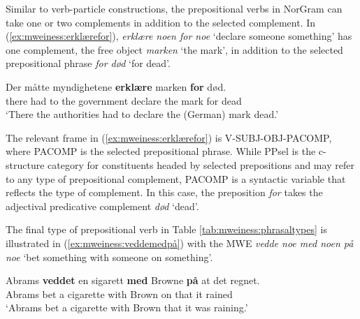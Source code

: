 \documentclass[output=paper]{langsci/langscibook}
\begin{document}
Similar to verb-particle constructions, the prepositional verbs in NorGram can take one or two complements in addition to the selected complement. 
In (\ref{ex:mweiness:erklærefor}), \emph{erklære noen for noe} `declare someone something' has one complement, the free object \emph{marken} `the mark',  in addition to the selected prepositional phrase  \emph{for død} `for dead'. 

\ea\label{ex:mweiness:erklærefor}
\gll   Der måtte myndighetene \textbf{erklære} marken \textbf{for} død. \\
        there {had to} {the government} declare {the mark} for dead \\
\glt `There the authorities had to declare the (German) mark dead.'\\ 
\z

The relevant frame in (\ref{ex:mweiness:erklærefor}) is V-SUBJ-OBJ-PACOMP, where PACOMP is the selected prepositional phrase.
While PPsel is the c-structure category for constituents headed by selected prepositions and may refer to any type of prepositional complement, PACOMP is a syntactic variable that reflects the type of complement. %
In this case, the preposition \emph{for} takes the adjectival predicative complement \emph{død} `dead'. %

The final type of prepositional verb in Table \ref{tab:mweiness:phrasaltypes} is illustrated in (\ref{ex:mweiness:veddemedpå}) with the MWE \emph{vedde noe med noen på noe} `bet something with someone on something'. 

\ea\label{ex:mweiness:veddemedpå}
\gll   Abrams \textbf{veddet} en sigarett \textbf{med} Browne \textbf{på} at det regnet. \\
        Abrams bet a cigarette with Brown on that it rained \\
\glt `Abrams bet a cigarette with Brown that it {was raining}.' \\ 
\z
\end{document}
